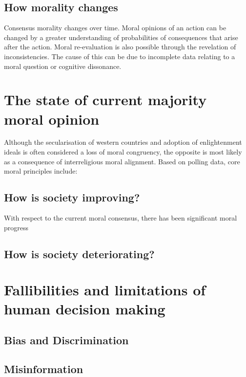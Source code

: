 \subsection{How morality changes}
Consensus morality changes over time.
Moral opinions of an action can be changed by a greater understanding of probabilities of consequences that arise after the action.
Moral re-evaluation is also possible through the revelation of inconsistencies.
The cause of this can be due to incomplete data relating to a moral question or cognitive dissonance.

\section{The state of current majority moral opinion}
Although the secularisation of western countries and adoption of enlightenment ideals is often considered a loss of moral congruency, the opposite is most likely as a consequence of interreligious moral alignment.
Based on polling data, core moral principles include:

\subsection{How is society improving?}
With respect to the current moral consensus, there has been significant moral progress  

\subsection{How is society deteriorating?}

\section{Fallibilities and limitations of human decision making}
\subsection{Bias and Discrimination}
\subsection{Misinformation}
